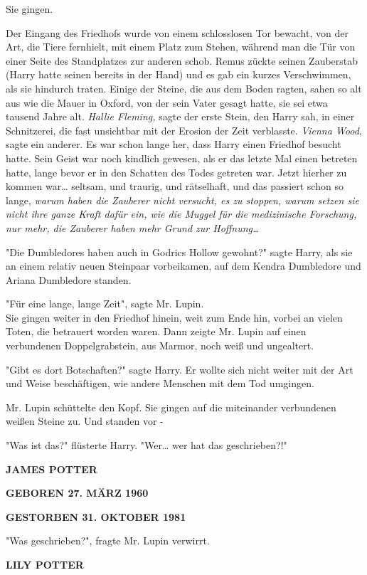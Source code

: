 {Sie gingen.

Der Eingang des Friedhofs wurde von einem schlosslosen Tor bewacht, von der Art, die Tiere fernhielt, mit einem Platz zum Stehen, während man die Tür von einer Seite des Standplatzes zur anderen schob. Remus zückte seinen Zauberstab (Harry hatte seinen bereits in der Hand) und es gab ein kurzes Verschwimmen, als sie hindurch traten. Einige der Steine, die aus dem Boden ragten, sahen so alt aus wie die Mauer in Oxford, von der sein Vater gesagt hatte, sie sei etwa tausend Jahre alt. \emph{Hallie Fleming,} sagte der erste Stein, den Harry sah, in einer Schnitzerei, die fast unsichtbar mit der Erosion der Zeit verblasste. \emph{Vienna Wood}, sagte ein anderer. Es war schon lange her, dass Harry einen Friedhof besucht hatte. Sein Geist war noch kindlich gewesen, als er das letzte Mal einen betreten hatte, lange bevor er in den Schatten des Todes getreten war. Jetzt hierher zu kommen war… seltsam, und traurig, und rätselhaft, und das passiert schon so lange, \emph{warum haben die Zauberer nicht versucht, es zu stoppen, warum setzen sie nicht ihre ganze Kraft dafür ein, wie die Muggel für die medizinische Forschung, nur mehr, die Zauberer haben mehr Grund zur Hoffnung…}

"Die Dumbledores haben auch in Godrics Hollow gewohnt?" sagte Harry, als sie an einem relativ neuen Steinpaar vorbeikamen, auf dem Kendra Dumbledore und Ariana Dumbledore standen.

"Für eine lange, lange Zeit", sagte Mr. Lupin.\\ Sie gingen weiter in den Friedhof hinein, weit zum Ende hin, vorbei an vielen Toten, die betrauert worden waren. Dann zeigte Mr. Lupin auf einen verbundenen Doppelgrabstein, aus Marmor, noch weiß und ungealtert.

"Gibt es dort Botschaften?" sagte Harry. Er wollte sich nicht weiter mit der Art und Weise beschäftigen, wie andere Menschen mit dem Tod umgingen.

Mr. Lupin schüttelte den Kopf. Sie gingen auf die miteinander verbundenen weißen Steine zu. Und standen vor -

"Was ist das?" flüsterte Harry. "Wer… wer hat das geschrieben?!"

\textbf{JAMES POTTER}

\textbf{GEBOREN 27. MÄRZ 1960}

\textbf{GESTORBEN 31. OKTOBER 1981}

"Was geschrieben?", fragte Mr. Lupin verwirrt.

\textbf{LILY POTTER}

}
